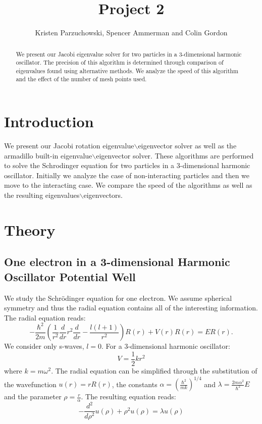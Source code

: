 \documentclass[10pt,showpacs,preprintnumbers,amsmath,amssymb,aps,prl,twocolumn,groupedaddress,superscriptaddress,showkeys]{revtex4-1}
\begin{document}
\title{Project 2}
\author{Kristen Parzuchowski, Spencer Ammerman and Colin Gordon}
\begin{abstract}
We present our Jacobi eigenvalue solver for two particles in a 3-dimensional harmonic oscillator. The precision of this algorithm is determined through comparison of eigenvalues found using alternative methods. We analyze the speed of this algorithm and the effect of the number of mesh points used. %
\end{abstract}
\maketitle

\section{Introduction}
We present our Jacobi rotation eigenvalue$\backslash$eigenvector solver as well as the armadillo built-in eigenvalue$\backslash$eigenvector solver. These algorithms are performed to solve the Schrodinger equation for two particles in a 3-dimensional harmonic oscillator. Initially we analyze the case of non-interacting particles and then we move to the interacting case. We compare the speed of the algorithms as well as the resulting eigenvalues$\backslash$eigenvectors.
\section{Theory}
\subsection{One electron in a 3-dimensional Harmonic Oscillator Potential Well}
We study the Schr\"{o}dinger equation for one electron. We assume spherical symmetry and thus the radial equation contains all of the interesting information. The radial equation reads:
\begin{equation}
  -\frac{\hbar^2}{2 m} \left ( \frac{1}{r^2} \frac{d}{dr} r^2
  \frac{d}{dr} - \frac{l (l + 1)}{r^2} \right )R(r) 
     + V(r) R(r) = E R(r).
\end{equation}
We consider only s-waves, $l=0$. For a 3-dimensional harmonic oscillator:
\begin{equation}
{V=\frac{1}{2}kr^2}
\end{equation}
where $k = m\omega^2$. The radial equation can be simplified through the substitution of the wavefunction $u(r) = rR(r)$, the constants $\alpha = (\frac{\hbar^2}{mk})^{1/4}$ and $\lambda = \frac{2m\alpha^2}{\hbar^2}E$ and the parameter $\rho = \frac{r}{\alpha}$. The resulting equation reads:
\begin{equation}
-\frac{d^2}{d\rho^2}u(\rho)+\rho^2u(\rho) = \lambda u(\rho)
\end{equation}
\end{document}
